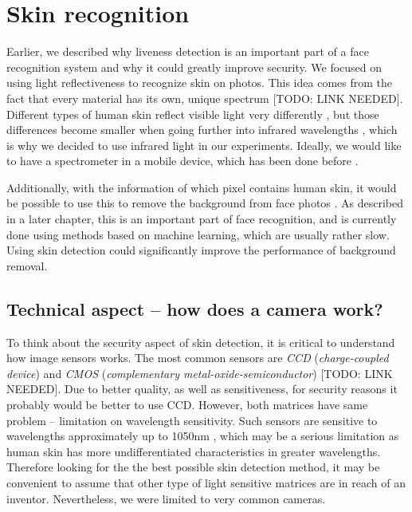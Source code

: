 \chapter{Skin recognition}
    Earlier, we described why liveness detection is an important part
    of a face recognition system and why it could greatly improve security.
    We focused on using light reflectiveness to recognize skin on photos.
    This idea comes from the fact that every material has its own, unique spectrum [TODO: LINK NEEDED].
    Different types of human skin reflect visible light very differently
    \cite{hsreflectance},
    but those differences become smaller when going further into infrared wavelengths
    \cite{visinfra} \cite{toyotaskin}, which is why we decided to use infrared light
    in our experiments.
    Ideally, we would like to have a spectrometer in a mobile device,
    which has been done before \cite{spectrometerphone}.

    Additionally, with the information of which pixel contains human skin,
    it would be possible to use this to remove the background from face
    photos \cite{colorstudy}.
    As described in a later chapter, this is an important part of face recognition,
    and is currently done using methods based on machine learning, which are usually
    rather slow.
    Using skin detection could significantly improve the performance of background
    removal.

    \section{Technical aspect -- how does a camera work?}
        To think about the security aspect of skin detection,
        it is critical to understand how image sensors works.
        The most common sensors are \textit{CCD} (\textit{charge-coupled device})
        and \textit{CMOS} (\textit{complementary metal-oxide-semiconductor})
        [TODO: LINK NEEDED].
        Due to better quality, as well as sensitiveness, for security reasons
        it probably would be better to use CCD.
        However, both matrices have same problem -- limitation on wavelength sensitivity.
        Such sensors are sensitive to wavelengths approximately up to 1050nm
        \cite{imagesensorsmax},
        which may be a serious limitation as human skin has more undifferentiated
        characteristics in greater wavelengths.
        Therefore looking for the the best possible skin detection method,
        it may be convenient to assume that other type of light sensitive matrices
        are in reach of an inventor.
        Nevertheless, we were limited to very common cameras.

